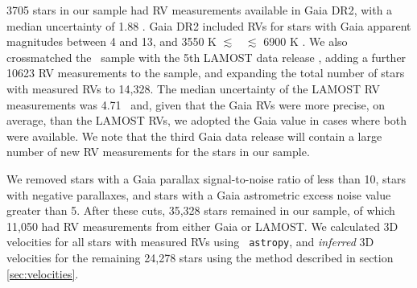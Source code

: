 
3705 stars in our sample had RV measurements available in Gaia DR2, with a
median uncertainty of 1.88 \kms.
Gaia DR2 included RVs for stars with Gaia apparent magnitudes between 4
and 13, and 3550 K $\lesssim$ \teff\ $\lesssim$ 6900 K \citep{brown2018}.
We also crossmatched the \mct\ sample with the 5th LAMOST data release
\citep{cui2012, xiang2019}, adding a further 10623 RV measurements to the
sample, and expanding the total number of stars with measured RVs to 14,328.
The median uncertainty of the LAMOST RV measurements was 4.71 \kms\ and,
given that the Gaia RVs were more precise, on average, than the LAMOST
RVs, we adopted the Gaia value in cases where both were available.
We note that the third Gaia data release will contain a large number of new
RV measurements for the stars in our sample.

We removed stars with a Gaia parallax signal-to-noise ratio of less than 10,
stars with negative parallaxes, and stars with a Gaia astrometric excess noise
value greater than 5.
After these cuts, 35,328 stars remained in our sample, of which 11,050 had RV
measurements from either Gaia or LAMOST.
We calculated 3D velocities for all stars with measured RVs using {\tt
astropy}, and {\it inferred} 3D velocities for the remaining 24,278 stars
using the method described in section \ref{sec:velocities}.

